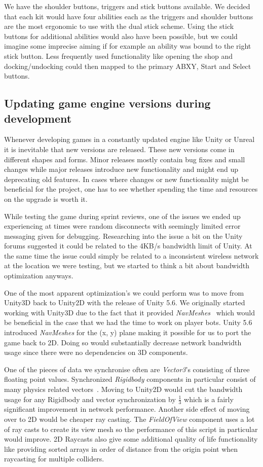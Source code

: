 We have the shoulder buttons, triggers and stick buttons available. We decided that each kit would have four abilities each as the triggers and shoulder buttons are the most ergonomic to use with the dual stick scheme. Using the stick buttons for additional abilities would also have been possible, but we could imagine some imprecise aiming if for example an ability was bound to the right stick button. Less frequently used functionality like opening the shop and docking/undocking could then mapped to the primary ABXY, Start and Select buttons.

\subsection{Updating game engine versions during development}
\label{sec:updatingGameEngine}
Whenever developing games in a constantly updated engine like Unity or Unreal it is inevitable that new versions are released. These new versions come in different shapes and forms. Minor releases mostly contain bug fixes and small changes while major releases introduce new functionality and might end up deprecating old features. In cases where changes or new functionality might be beneficial for the project, one has to see whether spending the time and resources on the upgrade is worth it. 

While testing the game during sprint reviews, one of the issues we ended up experiencing at times were random disconnects with seemingly limited error messaging given for debugging. Researching into the issue a bit on the Unity forums suggested it could be related to the 4KB/s bandwidth limit of Unity. At the same time the issue could simply be related to a inconsistent wireless network at the location we were testing, but we started to think a bit about bandwidth optimization anyways. 

One of the most apparent optimization's we could perform was to move from Unity3D back to Unity2D with the release of Unity 5.6. We originally started working with Unity3D due to the fact that it provided \emph{NavMeshes}~\cite{unityNavMeshes} which would be beneficial in the case that we had the time to work on player bots. Unity 5.6 introduced \emph{NavMeshes} for the (x, y) plane making it possible for us to port the game back to 2D. Doing so would substantially decrease network bandwidth usage since there were no dependencies on 3D components. 

One of the pieces of data we synchronise often are \emph{Vector3}'s consisting of three floating point values. Synchronized \emph{Rigidbody} components in particular consist of many physics related vectors~\cite{unityRigidbody}. Moving to Unity2D would cut the bandwidth usage for any Rigidbody and vector synchronization by $\frac{1}{3}$ which is a fairly significant improvement in network performance. Another side effect of moving over to 2D would be cheaper ray casting. The \emph{FieldOfView} component uses a lot of ray casts to create its view mesh so the performance of this script in particular would improve. 2D Raycasts also give some additional quality of life functionality like providing sorted arrays in order of distance from the origin point when raycasting for multiple colliders.  

